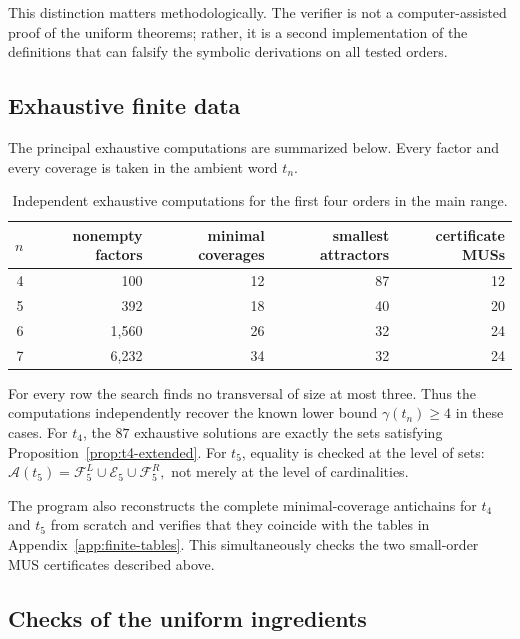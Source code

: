 \documentclass[10pt,a4paper]{article}
\theoremstyle{definition}\newtheorem{definition}[theorem]{Definition}
\theoremstyle{remark}\newtheorem{remark}[theorem]{Remark}
\newcommand{\Acal}{\mathcal{A}}
\newcommand{\FL}{\mathcal{F}^{L}}
\newcommand{\FR}{\mathcal{F}^{R}}
\begin{document}
This distinction matters methodologically.  The verifier is not a computer-assisted proof of the uniform theorems; rather, it is a second implementation of the definitions that can falsify the symbolic derivations on all tested orders.

\subsection{Exhaustive finite data}
\label{subsec:verification-data}

The principal exhaustive computations are summarized below.  Every factor and every coverage is taken in the ambient word $t_n$.

\begin{table}[ht]
\centering
\caption{Independent exhaustive computations for the first four orders in the main range.}
\label{tab:independent-computations}
\begin{tabular}{rrrrr}
\toprule
$n$ & nonempty factors & minimal coverages & smallest attractors & certificate MUSs\\
\midrule
4 & 100   & 12 & 87 & 12\\
5 & 392   & 18 & 40 & 20\\
6 & 1,560 & 26 & 32 & 24\\
7 & 6,232 & 34 & 32 & 24\\
\bottomrule
\end{tabular}
\end{table}

For every row the search finds no transversal of size at most three.  Thus the computations independently recover the known lower bound $\gamma(t_n)\ge4$ in these cases.  For $t_4$, the $87$ exhaustive solutions are exactly the sets satisfying Proposition~\ref{prop:t4-extended}.  For $t_5$, equality is checked at the level of sets:
$
 \Acal(t_5)=\FL_5\cup\mathcal E_5\cup\FR_5,
$
not merely at the level of cardinalities.

The program also reconstructs the complete minimal-coverage antichains for $t_4$ and $t_5$ from scratch and verifies that they coincide with the tables in Appendix~\ref{app:finite-tables}.  This simultaneously checks the two small-order MUS certificates described above.

\subsection{Checks of the uniform ingredients}
\label{subsec:uniform-checks}
\end{document}
